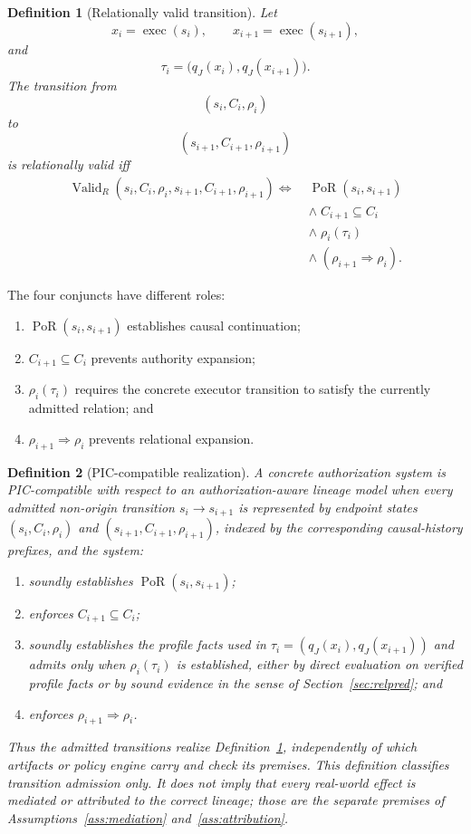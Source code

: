 \documentclass[10pt,twocolumn]{article}
\newcommand{\exec}{\operatorname{exec}}
\newcommand{\ValidR}{\operatorname{Valid}_{R}}
\newcommand{\PoR}{\operatorname{PoR}}
\newtheorem{definition}{Definition}
\begin{document}
\begin{definition}[Relationally valid transition]\label{def:valid-transition}
Let
\[
x_i=\exec(s_i),
\qquad
x_{i+1}=\exec(s_{i+1}),
\]
and
\[
\tau_i=
\big(
q_J(x_i),
q_J(x_{i+1})
\big).
\]
The transition from
\[
(s_i,C_i,\rho_i)
\]
to
\[
(s_{i+1},C_{i+1},\rho_{i+1})
\]
is relationally valid iff
\[
\begin{aligned}
\ValidR
(s_i,C_i,\rho_i,s_{i+1},C_{i+1},\rho_{i+1})
\Longleftrightarrow\;&
\PoR(s_i,s_{i+1})
\\
&\land\; C_{i+1}\subseteq C_i
\\
&\land\; \rho_i(\tau_i)
\\
&\land\;(\rho_{i+1}\Rightarrow\rho_i).
\end{aligned}
\]
\end{definition}

The four conjuncts have different roles:

\begin{enumerate}
    \item \(\PoR(s_i,s_{i+1})\) establishes causal continuation;
    \item \(C_{i+1}\subseteq C_i\) prevents authority expansion;
    \item \(\rho_i(\tau_i)\) requires the concrete executor transition to
    satisfy the currently admitted relation; and
    \item \(\rho_{i+1}\Rightarrow\rho_i\) prevents relational expansion.
\end{enumerate}

\begin{definition}[PIC-compatible realization]
\label{def:pic-compatible}
A concrete authorization system is \emph{PIC-compatible} with respect to an
authorization-aware lineage model when every admitted non-origin transition
\(s_i\to s_{i+1}\) is represented by endpoint states
\((s_i,C_i,\rho_i)\) and \((s_{i+1},C_{i+1},\rho_{i+1})\), indexed by the
corresponding causal-history prefixes, and the system:
\begin{enumerate}
    \item soundly establishes \(\PoR(s_i,s_{i+1})\);
    \item enforces \(C_{i+1}\subseteq C_i\);
    \item soundly establishes the profile facts used in
    \(\tau_i=(q_J(x_i),q_J(x_{i+1}))\) and admits only when
    \(\rho_i(\tau_i)\) is established, either by direct evaluation on
    verified profile facts or by sound evidence in the sense of
    Section~\ref{sec:relpred}; and
    \item enforces \(\rho_{i+1}\Rightarrow\rho_i\).
\end{enumerate}
Thus the admitted transitions realize Definition~\ref{def:valid-transition},
independently of which artifacts or policy engine carry and check its premises.
This definition classifies transition admission only. It does not imply that
every real-world effect is mediated or attributed to the correct lineage;
those are the separate premises of Assumptions~\ref{ass:mediation}
and~\ref{ass:attribution}.
\end{definition}
\end{document}
